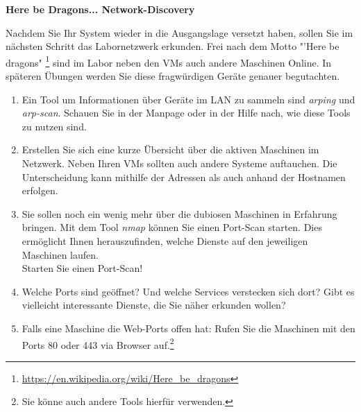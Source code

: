 \documentclass[paper=a4,fontsize=11pt]{scrartcl}%
\numberwithin{equation}{section}
\begin{document}
\begin{center}\Large{\textbf{Here be Dragons... Network-Discovery}}\end{center}\vskip0.25in
Nachdem Sie Ihr System wieder in die Ausgangslage versetzt haben, sollen Sie im nächsten Schritt das Labornetzwerk erkunden. Frei nach dem Motto "'Here be dragons" \footnote{\url{https://en.wikipedia.org/wiki/Here_be_dragons}} sind im Labor neben den VMs auch andere Maschinen Online. In späteren Übungen werden Sie diese fragwürdigen Geräte genauer begutachten.
\begin{enumerate}
	\item Ein Tool um Informationen über Geräte im LAN zu sammeln sind \emph{arping} und \emph{arp-scan}. Schauen Sie in der Manpage oder in der Hilfe nach, wie diese Tools zu nutzen sind. 
	\item Erstellen Sie sich eine kurze Übersicht über die aktiven Maschinen im Netzwerk. Neben Ihren VMs sollten auch andere Systeme auftauchen. Die Unterscheidung kann mithilfe der Adressen als auch anhand der Hostnamen erfolgen.
	\item Sie sollen noch ein wenig mehr über die dubiosen Maschinen in Erfahrung bringen. Mit dem Tool \emph{nmap} können Sie einen Port-Scan starten. Dies ermöglicht Ihnen herauszufinden, welche Dienste auf den jeweiligen Maschinen laufen.\\
	Starten Sie einen Port-Scan!
	\item Welche Ports sind geöffnet? Und welche Services verstecken sich dort? Gibt es vielleicht interessante Dienste, die Sie näher erkunden wollen?
	\item Falls eine Maschine die Web-Ports offen hat: Rufen Sie die Maschinen mit den Ports 80 oder 443 via Browser auf.\footnote{Sie könne auch andere Tools hierfür verwenden.}
\end{enumerate}
\end{document}
